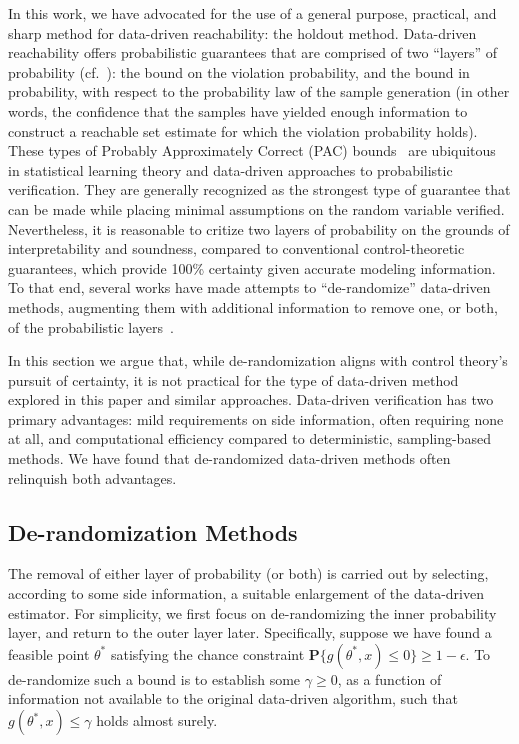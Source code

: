 \documentclass[letterpaper, 10 pt, conference]{ieeeconf}  %
\begin{document}
In this work, we have advocated for the use of a general purpose, practical, and sharp method for data-driven reachability: the holdout method.
Data-driven reachability offers probabilistic guarantees that are comprised of two ``layers'' of probability (cf.~): the bound on the violation probability, and the bound in probability, with respect to the probability law of the sample generation (in other words, the confidence that the samples have yielded enough information to construct a reachable set estimate for which the violation probability holds).
These types of Probably Approximately Correct (PAC) bounds~\cite{valiant1984pac} are ubiquitous in statistical learning theory and data-driven approaches to probabilistic verification. They are generally recognized as the strongest type of guarantee that can be made while placing minimal assumptions on the random variable verified. 
Nevertheless, it is reasonable to critize two layers of probability on the grounds of interpretability and soundness, compared to conventional control-theoretic guarantees, which provide 100\% certainty given accurate modeling information. To that end, several works have made attempts to ``de-randomize'' data-driven methods, augmenting them with additional information to remove one, or both, of the probabilistic layers~\cite{lecchini2010optimization,esfahani2014performance,pmlr-v155-boffi21a}.

In this section we argue that, while de-randomization aligns with control theory’s pursuit of certainty, it is not practical for the type of data-driven method explored in this paper and similar approaches.
Data-driven verification has two primary advantages:
mild requirements on side information, often requiring none at all, and 
computational efficiency compared to deterministic, sampling-based methods. 
We have found that de-randomized data-driven methods often relinquish both advantages.


\subsection{De-randomization Methods}
\label{sec:derandomization_methods}
The removal of either layer of probability (or both) is carried out by selecting, according to some side information, a suitable enlargement of the data-driven estimator. For simplicity,
we first focus on de-randomizing the inner probability layer, and return to the outer layer later. Specifically, suppose we have found a feasible point $\theta^*$ satisfying the chance constraint $\mathbf{P}\{ g(\theta^*,x) \le 0 \} \ge 1-\epsilon$. To de-randomize such a bound is to establish some $\gamma \ge 0$, as a function of information not available to the original data-driven algorithm, such that $g(\theta^*, x) \le \gamma$ holds almost surely.
\end{document}

